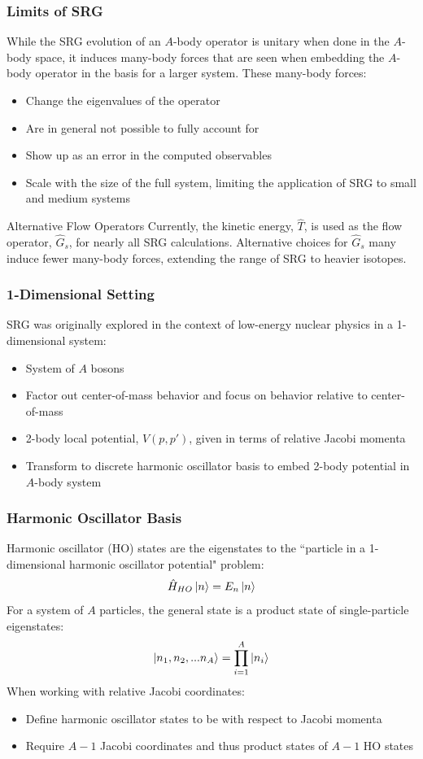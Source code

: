 \documentclass{beamer}
\begin{document}
{\begin{frame}
\frametitle{Limits of SRG}
While the SRG evolution of an $A$-body operator is unitary when done in the $A$-body space, it induces many-body forces that are seen when embedding the $A$-body operator in the basis for a larger system. These many-body forces:
\begin{itemize}
    \item Change the eigenvalues of the operator
    \item Are in general not possible to fully account for
    \item Show up as an error in the computed observables
    \item Scale with the size of the full system, limiting the application of SRG to small and medium systems
\end{itemize}
\pause
\begin{alertblock}{Alternative Flow Operators}
Currently, the kinetic energy, $\hat{T}$, is used as the flow operator, $\hat{G}_s$, for nearly all SRG calculations. Alternative choices for $\hat{G}_s$ many induce fewer many-body forces, extending the range of SRG to heavier isotopes.
\end{alertblock}
\end{frame}

\begin{frame}
\frametitle{1-Dimensional Setting}
SRG was originally explored in the context of low-energy nuclear physics in a 1-dimensional system:
\begin{itemize}
    \item System of $A$ bosons
    \item Factor out center-of-mass behavior and focus on behavior relative to center-of-mass
    \item 2-body local potential, $V(p, p')$, given in terms of relative Jacobi momenta
    \item Transform to discrete harmonic oscillator basis to embed 2-body potential in $A$-body system
\end{itemize}
\end{frame}

\begin{frame}
\frametitle{Harmonic Oscillator Basis}
Harmonic oscillator (HO) states are the eigenstates to the ``particle in a 1-dimensional harmonic oscillator potential" problem:
\begin{equation}
\hat{H}_{HO}\ket{n} = E_n\ket{n}
\end{equation}
\pause
For a system of $A$ particles, the general state is a product state of single-particle eigenstates:
\begin{equation}
\ket{n_1,n_2,...n_A} = \prod_{i=1}^A\ket{n_i}
\end{equation}
\pause
When working with relative Jacobi coordinates:
\begin{itemize}
    \item Define harmonic oscillator states to be with respect to Jacobi momenta
    \item Require $A-1$ Jacobi coordinates and thus product states of $A-1$ HO states
\end{itemize}
\end{frame}

}
\end{document}
